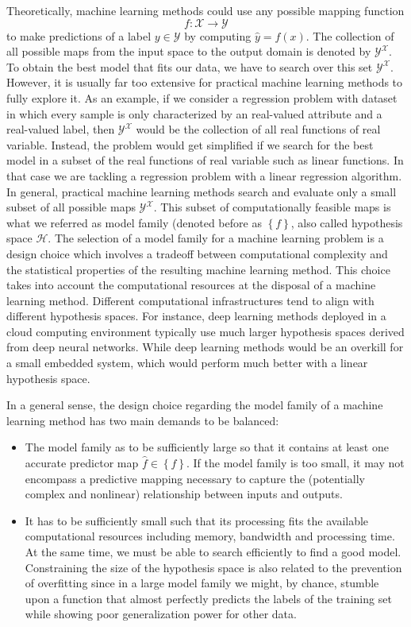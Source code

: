 Theoretically, machine learning methods could use any possible mapping function $$f: \mathcal{X} \longrightarrow \mathcal{Y}$$ to make predictions of a label $y\in \mathcal{Y}$ by computing $\hat{y}=f(x)$. The collection of all possible maps from the input space to the output domain is denoted by $\mathcal{Y}^{\mathcal{X}}$. To obtain the best model that fits our data, we have to search over this set $\mathcal{Y}^{\mathcal{X}}$. However, it is usually far too extensive for practical machine learning methods to fully explore it. As an example, if we consider a regression problem with dataset in which every sample is only characterized by an real-valued attribute and a real-valued label, then $\mathcal{Y}^{\mathcal{X}}$ would be the collection of all real functions of real variable. Instead, the problem would get simplified if we search for the best model in a subset of the real functions of real variable such as linear functions. In that case we are tackling a regression problem with a linear regression algorithm. In general, practical machine learning methods search and evaluate only a small subset of all possible maps $\mathcal{Y}^{\mathcal{X}}$. This subset of computationally feasible maps is what we referred as model family (denoted before as $\left\lbrace f \right \rbrace$, also called hypothesis space $\mathcal{H}$. The selection of a model family for a machine learning problem is a design choice which involves a tradeoff between computational complexity and the statistical properties of the resulting machine learning method.  This choice takes into account the computational resources at the disposal of a machine learning method. Different computational infrastructures tend to align with different hypothesis spaces. For instance, deep learning methods deployed in a cloud computing environment typically use much larger hypothesis spaces derived from deep neural networks. While deep learning methods would be an overkill for a small embedded system, which would perform much better with a linear hypothesis space. 

In a general sense, the design choice regarding the model family of a machine learning method has two main demands to be balanced: 
\begin{itemize}
    \item The model family as to be sufficiently large so that it contains at least one accurate predictor map $\hat{f}\in \left\lbrace f \right\rbrace$. If the model family is too small, it may not encompass a predictive mapping necessary to capture the (potentially complex and nonlinear) relationship between inputs and outputs.

    \item It has to be sufficiently small such that its processing fits the available computational resources including memory, bandwidth and processing time. At the same time, we must be able to search efficiently to find a good model. Constraining the size of the hypothesis space is also related to the prevention of overfitting since in a large model family we might, by chance, stumble upon a function that almost perfectly predicts the labels of the training set while showing poor generalization power for other data.
\end{itemize}


